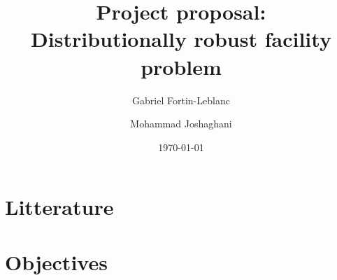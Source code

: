 \documentclass[letterpaper, 12pt]{article}
\title{
	Project proposal: \\
	Distributionally robust facility problem
}
\author[1]{Gabriel Fortin-Leblanc}
\author[2]{Mohammad Joshaghani}
\affil[1]{Université de Montréal}
\affil[2]{Université du Québec à Montréal}
\date{\today}
\begin{document}
	\maketitle
	
	
	\section*{Litterature}
	
	\section*{Objectives}
	
	
	
\end{document}
